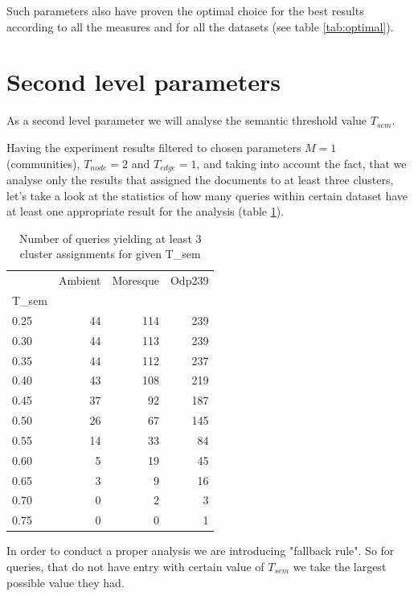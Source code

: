 \documentclass[a4paper, 12pt, oneside]{Thesis} %
\begin{document}
Such parameters also have proven the optimal choice for the best results according to all the measures and for all the datasets (see table \ref{tab:optimal}).

\section{Second level parameters}

As a second level parameter we will analyse the semantic threshold value $T_{sem}$. 

Having the experiment results filtered to chosen parameters $M = 1$ (communities), $T_{node} = 2$ and $T_{edge} = 1$, and taking into account the fact, that we analyse only the results that assigned the documents to at least three clusters, let's take a look at the statistics of how many queries within certain dataset have at least one appropriate result for the analysis (table \ref{tab:fallback}).

\begin{table}[th]
\centering
\begin{tabular}{lrrr}
\toprule
{} &  Ambient &  Moresque &  Odp239 \\
T_{sem} &          &           &         \\
\midrule
0.25  &       44 &       114 &     239 \\
0.30  &       44 &       113 &     239 \\
0.35  &       44 &       112 &     237 \\
0.40  &       43 &       108 &     219 \\
0.45  &       37 &        92 &     187 \\
0.50  &       26 &        67 &     145 \\
0.55  &       14 &        33 &      84 \\
0.60  &        5 &        19 &      45 \\
0.65  &        3 &         9 &      16 \\
0.70  &        0 &         2 &       3 \\
0.75  &        0 &         0 &       1 \\
\bottomrule
\end{tabular}
\caption{Number of queries yielding at least 3 cluster assignments for given T_{sem}}
\label{tab:fallback}
\end{table}

In order to conduct a proper analysis we are introducing "fallback rule". So for queries, that do not have entry with certain value of $T_{sem}$ we take the largest possible value they had.
\end{document}
